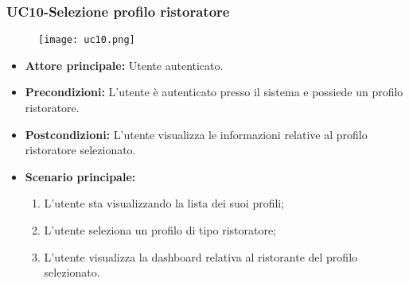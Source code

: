 \pagebreak
\subsubsection{UC10-Selezione profilo ristoratore}
\begin{figure}[h] \texttt{[image: uc10.png]} \end{figure}
\begin{itemize}
\item \textbf{Attore principale:} Utente autenticato.
\item \textbf{Precondizioni:} L'utente è autenticato presso il sistema e possiede un profilo ristoratore.
\item \textbf{Postcondizioni:} L'utente visualizza le informazioni relative al profilo ristoratore selezionato.
\item \textbf{Scenario principale:}
\begin{enumerate}
    \item L'utente sta visualizzando la lista dei suoi profili;
    \item L'utente seleziona un profilo di tipo ristoratore;
    \item L'utente visualizza la dashboard relativa al ristorante del profilo selezionato.
\end{enumerate}
\end{itemize}

